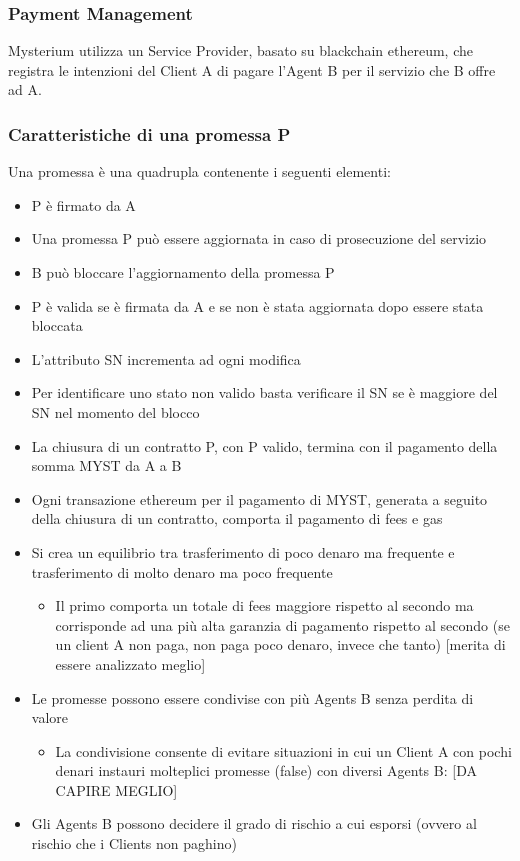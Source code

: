 \documentclass[]{article}
\begin{document}
	\subsubsection{Payment Management}
	Mysterium utilizza un Service Provider, basato su blackchain ethereum, che registra le intenzioni del Client A di pagare l’Agent B per il servizio che B offre ad A.	
	
	\subsubsection{Caratteristiche di una promessa P}
	Una promessa è una quadrupla contenente i seguenti elementi:
	
	\begin{itemize}
	\item P è firmato da A
	\item Una promessa P può essere aggiornata in caso di prosecuzione del servizio
	\item B può bloccare l’aggiornamento della promessa P
	\item P è valida se è firmata da A e se non è stata aggiornata dopo essere stata bloccata
	\item L’attributo SN incrementa ad ogni modifica
	\item Per identificare uno stato non valido basta verificare il SN se è maggiore del SN nel momento del blocco
	\item La chiusura di un contratto P, con P valido, termina con il pagamento della somma MYST da A a B
	\item Ogni transazione ethereum per il pagamento di MYST, generata a seguito della chiusura di un contratto, comporta il pagamento di fees e gas
	\item Si crea un equilibrio tra trasferimento di poco denaro ma frequente e trasferimento di molto denaro ma poco frequente
	\begin{itemize}
	\item Il primo comporta un totale di fees maggiore rispetto al secondo ma corrisponde ad una più alta garanzia di pagamento rispetto al secondo (se un client A non paga, non paga poco denaro, invece che tanto) [merita di essere analizzato meglio]
	\end{itemize}
	\item Le promesse possono essere condivise con più Agents B senza perdita di valore
	\begin{itemize}
	\item La condivisione consente di evitare situazioni in cui un Client A con pochi denari instauri molteplici promesse (false) con diversi Agents B: [DA CAPIRE MEGLIO]
	\end{itemize}
	\item Gli Agents B possono decidere il grado di rischio a cui esporsi (ovvero al rischio che i Clients non paghino)
	\end{itemize}	
\end{document}
